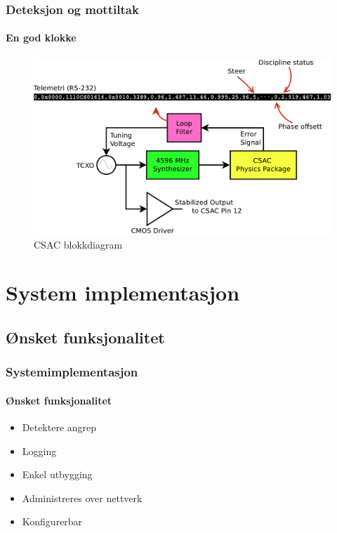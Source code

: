 \documentclass[xcolor=table]{beamer}
\begin{document}
\begin{frame}
\frametitle{Deteksjon og mottiltak}
  \framesubtitle{En god klokke}
      \begin{figure}
        \includegraphics[scale=0.35]{thesis/graphics/csac_schematic.pdf}
      \caption{CSAC blokkdiagram}
    \end{figure}
\end{frame}

\section{System implementasjon}
\subsection{Ønsket funksjonalitet}
\begin{frame}
\frametitle{Systemimplementasjon}
  \framesubtitle{Ønsket funksjonalitet}
  \begin{itemize}
    \item Detektere angrep
    \item Logging
    \item Enkel utbygging
    \item Administreres over nettverk
    \item Konfigurerbar 
  \end{itemize}
\end{frame}
\end{document}
